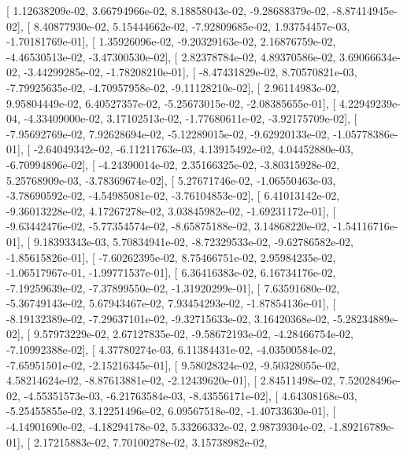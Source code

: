 \documentclass{article}
\begin{document}
       [  1.12638209e-02,   3.66794966e-02,   8.18858043e-02,
         -9.28688379e-02,  -8.87414945e-02],
       [  8.40877930e-02,   5.15444662e-02,  -7.92809685e-02,
          1.93754457e-03,  -1.70181769e-01],
       [  1.35926096e-02,  -9.20329163e-02,   2.16876759e-02,
         -4.46530513e-02,  -3.47300530e-02],
       [  2.82378784e-02,   4.89370586e-02,   3.69066634e-02,
         -3.44299285e-02,  -1.78208210e-01],
       [ -8.47431829e-02,   8.70570821e-03,  -7.79925635e-02,
         -4.70957958e-02,  -9.11128210e-02],
       [  2.96114983e-02,   9.95804449e-02,   6.40527357e-02,
         -5.25673015e-02,  -2.08385655e-01],
       [  4.22949239e-04,  -4.33409000e-02,   3.17102513e-02,
         -1.77680611e-02,  -3.92175709e-02],
       [ -7.95692769e-02,   7.92628694e-02,  -5.12289015e-02,
         -9.62920133e-02,  -1.05778386e-01],
       [ -2.64049342e-02,  -6.11211763e-03,   4.13915492e-02,
          4.04452880e-03,  -6.70994896e-02],
       [ -4.24390014e-02,   2.35166325e-02,  -3.80315928e-02,
          5.25768909e-03,  -3.78369674e-02],
       [  5.27671746e-02,  -1.06550463e-03,  -3.78690592e-02,
         -4.54985081e-02,  -3.76104853e-02],
       [  6.41013142e-02,  -9.36013228e-02,   4.17267278e-02,
          3.03845982e-02,  -1.69231172e-01],
       [ -9.63442476e-02,  -5.77354574e-02,  -8.65875188e-02,
          3.14868220e-02,  -1.54116716e-01],
       [  9.18393343e-03,   5.70834941e-02,  -8.72329533e-02,
         -9.62786582e-02,  -1.85615826e-01],
       [ -7.60262395e-02,   8.75466751e-02,   2.95984235e-02,
         -1.06517967e-01,  -1.99771537e-01],
       [  6.36416383e-02,   6.16734176e-02,  -7.19259639e-02,
         -7.37899550e-02,  -1.31920299e-01],
       [  7.63591680e-02,  -5.36749143e-02,   5.67943467e-02,
          7.93454293e-02,  -1.87854136e-01],
       [ -8.19132389e-02,  -7.29637101e-02,  -9.32715633e-02,
          3.16420368e-02,  -5.28234889e-02],
       [  9.57973229e-02,   2.67127835e-02,  -9.58672193e-02,
         -4.28466754e-02,  -7.10992388e-02],
       [  4.37780274e-03,   6.11384431e-02,  -4.03500584e-02,
         -7.65951501e-02,  -2.15216345e-01],
       [  9.58028324e-02,  -9.50328055e-02,   4.58214624e-02,
         -8.87613881e-02,  -2.12439620e-01],
       [  2.84511498e-02,   7.52028496e-02,  -4.55351573e-03,
         -6.21763584e-03,  -8.43556171e-02],
       [  4.64308168e-03,  -5.25455855e-02,   3.12251496e-02,
          6.09567518e-02,  -1.40733630e-01],
       [ -4.14901690e-02,  -4.18294178e-02,   5.33266332e-02,
          2.98739304e-02,  -1.89216789e-01],
       [  2.17215883e-02,   7.70100278e-02,   3.15738982e-02,
\end{document}

